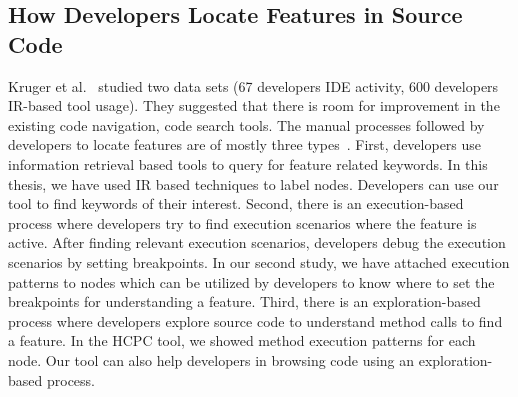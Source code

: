 \subsection{How Developers Locate Features in Source Code}
\label{related:feature_locate}
Kruger et al.~\cite{kruger2019features} studied two data sets (67 developers IDE activity, 600 developers IR-based tool usage). They suggested that there is room for improvement in the existing code navigation, code search tools. The manual processes followed by developers to locate features are of mostly three types~\cite{damevski2016field, wang2011exploratory, revelle2005understanding}. First, developers use information retrieval based tools to query for feature related keywords. In this thesis, we have used IR based techniques to label nodes. Developers can use our tool to find keywords of their interest. Second, there is an  execution-based process where developers try to find execution scenarios where the feature is active. After finding relevant execution scenarios, developers debug the execution scenarios by setting breakpoints. In our second study, we have attached execution patterns to nodes which can be utilized by developers to know where to set the breakpoints for understanding a feature. Third, there is an exploration-based process where developers explore source code to understand method calls to find a feature. In the HCPC tool, we showed method execution patterns for each node. Our tool can also help developers in browsing code using an  exploration-based process.

